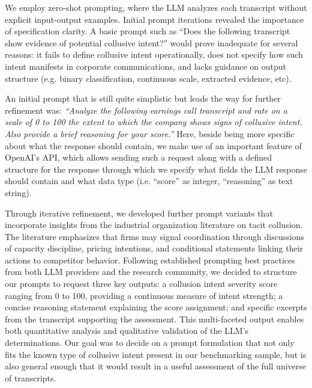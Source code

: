 We employ zero-shot prompting, where the LLM analyzes each transcript without explicit input-output examples. Initial prompt iterations revealed the importance of specification clarity. A basic prompt such as ``Does the following transcript show evidence of potential collusive intent?'' would prove inadequate for several reasons: it fails to define collusive intent operationally, does not specify how such intent manifests in corporate communications, and lacks guidance on output structure (e.g. binary classification, continuous scale, extracted evidence, etc).

An initial prompt that is still quite simplistic but leads the way for further refinement was: \textit{``Analyze the following earnings call transcript and rate on a scale of 0 to 100 the extent to which the company shows signs of collusive intent. Also provide a brief reasoning for your score.''} Here, beside being more specific about what the response should contain, we make use of an important feature of OpenAI's API, which allows sending such a request along with a defined structure for the response through which we specify what fields the LLM response should contain and what data type (i.e. ``score'' as integer, ``reasoning'' as text string).

Through iterative refinement, we developed further prompt variants that incorporate insights from the industrial organization literature on tacit collusion. The literature emphasizes that firms may signal coordination through discussions of capacity discipline, pricing intentions, and conditional statements linking their actions to competitor behavior. Following established prompting best practices from both LLM providers and the research community, we decided to structure our prompts to request three key outputs: a collusion intent severity score ranging from 0 to 100, providing a continuous measure of intent strength; a concise reasoning statement explaining the score assignment; and specific excerpts from the transcript supporting the assessment. This multi-faceted output enables both quantitative analysis and qualitative validation of the LLM's determinations. Our goal was to decide on a prompt formulation that not only fits the known type of collusive intent present in our benchmarking sample, but is also general enough that it would result in a useful assessment of the full universe of transcripts.

